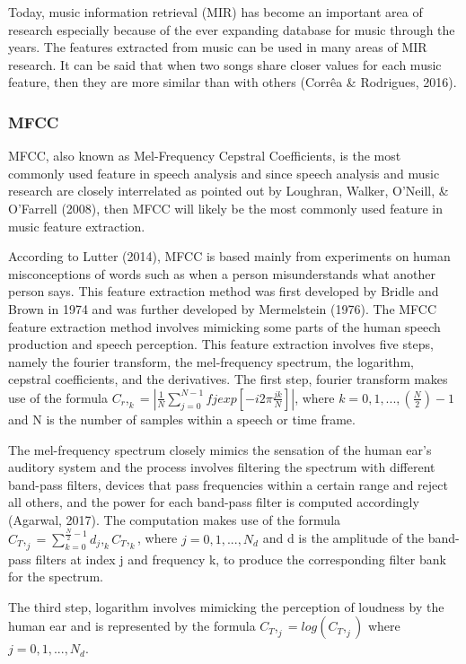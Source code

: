 Today, music information retrieval (MIR) has become an important area of research especially because of the ever expanding database for music through the years. The features extracted from music can be used in many areas of MIR research. It can be said that when two songs share closer values for each music feature, then they are more similar than with others (Corrêa \& Rodrigues, 2016).

\subsubsection{MFCC}

MFCC, also known as Mel-Frequency Cepstral Coefficients, is the most commonly used feature in speech analysis and since speech analysis and music research are closely interrelated as pointed out by Loughran, Walker, O'Neill, \& O'Farrell (2008), then MFCC will likely be the most commonly used feature in music feature extraction.

According to Lutter (2014), MFCC is based mainly from experiments on human misconceptions of words such as when a person misunderstands what another person says. This feature extraction method was first developed by Bridle and Brown in 1974 and was further developed by Mermelstein (1976).  The MFCC feature extraction method involves mimicking some parts of the human speech production and speech perception. This feature extraction involves five steps, namely the fourier transform, the mel-frequency spectrum, the logarithm, cepstral coefficients, and the derivatives. The first step, fourier transform makes use of the formula $C_r,_k=| \frac{1}{N}\sum_{j=0}^{N-1} fj exp [-i 2 \pi \frac{jk}{N}]|$, where $k=0,1,...,(\frac{N}{2})-1$ and N is the number of samples within a speech or time frame.

The mel-frequency spectrum closely mimics the sensation of the human ear's auditory system and the process involves filtering the spectrum with different band-pass filters, devices that pass frequencies within a certain range and reject all others, and the power for each band-pass filter is computed accordingly (Agarwal, 2017). The computation makes use of the formula $C_T,_j=\sum_{k=0}^{\frac{N}{2}-1} d_j,_k C_T,_k $, where $j=0,1,...,N_d$ and d is the amplitude of the band-pass filters at index j and frequency k, to produce the corresponding filter bank for the spectrum.

The third step, logarithm involves mimicking the perception of loudness by the human ear and is represented by the formula $C_T,_j= log(C_T,_j)$  where $ j=0,1,...,N_d$.

